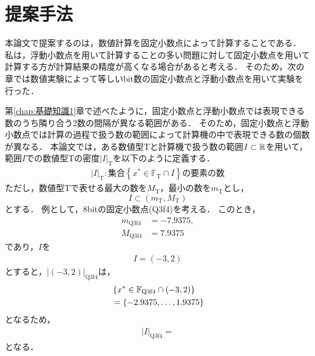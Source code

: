 \chapter{提案手法}
\label{chap:提案手法}
本論文で提案するのは，数値計算を固定小数点によって計算することである．
私は，浮動小数点を用いて計算することの多い問題に対して固定小数点を用いて計算する方が計算結果の精度が高くなる場合があると考える．
そのため，次の章では数値実験によって等しいbit数の固定小数点と浮動小数点を用いて実験を行った．


第\ref{chap:基礎知識1}章で述べたように，固定小数点と浮動小数点では表現できる数のうち隣り合う2数の間隔が異なる範囲がある．
そのため，固定小数点と浮動小数点では計算の過程で扱う数の範囲によって計算機の中で表現できる数の個数が異なる． %
本論文では，ある数値型$\mathrm{T}$と計算機で扱う数の範囲$I \subset \mathbb{R}$を用いて，範囲$I$での数値型$\mathrm{T}$の密度${|I|}_{\mathrm{T}}$を以下のように定義する．
\begin{align}
    \label{eq:def_density}
    {|I|}_{\mathrm{T}}: \text{集合}\left\{x^{\ast} \in \mathbb{F}_{\mathrm{T}} \cap I \right\}\text{の要素の数}
\end{align}
ただし，数値型$\mathrm{T}$で表せる最大の数を$M_{\mathrm{T}}$，最小の数を$m_{\mathrm{T}}$とし，
\begin{equation}
    I \subset (m_{\mathrm{T}}, M_{\mathrm{T}})
\end{equation}
とする．
例として，8bitの固定小数点(Q3f4)を考える．
このとき，
\begin{align}
    m_{\mathrm{Q}3\mathrm{f}4} &= -7.9375, \\
    M_{\mathrm{Q}3\mathrm{f}4} &= 7.9375
\end{align}
であり，$I$を
\begin{eqnarray}
    I = \left(-3,2\right)
\end{eqnarray}
とすると，${|\left(-3,2\right)|}_{\mathrm{Q}3\mathrm{f}4}$は，
\begin{align}
    &\left\{x^{\ast}\in \mathbb{F}_{\text{Q}{3}\text{f}{4}} \cap (-3,2)\right\} \\
    &= \left\{-2.9375,\dots,1.9375\right\}
\end{align}
となるため，
\begin{align}
    {|I|}_{\mathrm{Q}3\mathrm{f}4} = 
\end{align}
となる．
